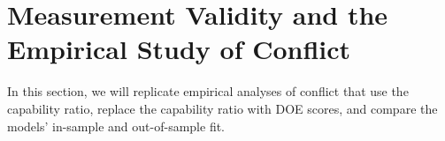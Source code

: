 \section{Measurement Validity and the Empirical Study of Conflict}

In this section, we will replicate empirical analyses of conflict that use the capability ratio, replace the capability ratio with DOE scores, and compare the models' in-sample and out-of-sample fit.

